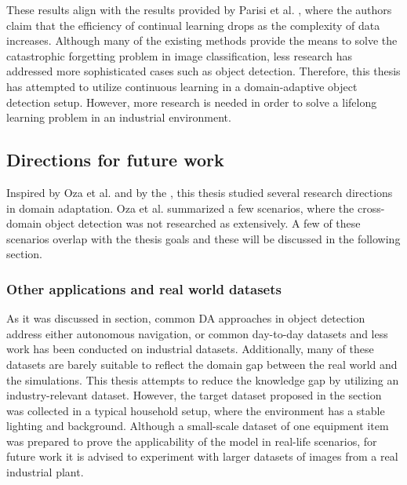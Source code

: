 These results align with the results provided by Parisi et al. \cite{Parisi2018}, where the authors claim that the efficiency of continual learning drops as the complexity of data increases. Although many of the existing methods provide the means to solve the catastrophic forgetting problem in image classification, less research has addressed more sophisticated cases such as object detection. Therefore, this thesis has attempted to utilize continuous learning in a domain-adaptive object detection setup. However, more research is needed in order to solve a lifelong learning problem in an industrial environment. 
\FloatBarrier 


\subsection{Directions for future work}
Inspired by Oza et al. \cite{Oza2021} and by the , this thesis studied several  research directions in domain adaptation. Oza et al. summarized a few scenarios, where the cross-domain object detection was not researched as extensively. A few of these scenarios overlap with the thesis goals and these will be discussed in the following section. 

\subsubsection{Other applications and real world datasets}
As it was discussed in  section, common DA approaches in object detection address either autonomous navigation, or common day-to-day datasets and less work has been conducted on industrial datasets. Additionally, many of these datasets are barely suitable to reflect the domain gap between the real world and the simulations. This thesis attempts to reduce the knowledge gap by utilizing an industry-relevant dataset. However, the target dataset proposed in the  section was collected in a typical household setup, where the environment has a stable lighting and background. Although a small-scale dataset of one equipment item was prepared to prove the applicability of the model in real-life scenarios, for future work  it is advised to experiment with larger datasets of images from a real industrial plant. 

